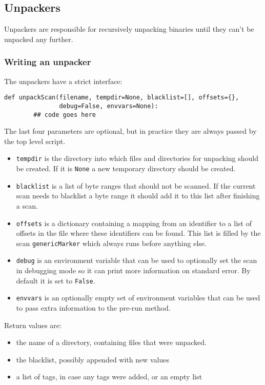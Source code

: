 \documentclass[10pt]{article}
\begin{document}
\subsection{Unpackers}

Unpackers are responsible for recursively unpacking binaries until they
can't be unpacked any further.

\subsubsection{Writing an unpacker}

The unpackers have a strict interface:

\begin{verbatim}
def unpackScan(filename, tempdir=None, blacklist=[], offsets={},
               debug=False, envvars=None):
        ## code goes here
\end{verbatim}

The last four parameters are optional, but in practice they are always passed
by the top level script.

\begin{itemize}
\item \texttt{tempdir} is the directory into which files and directories for
unpacking should be created. If it is \texttt{None} a new temporary directory
should be created.
\item \texttt{blacklist} is a list of byte ranges that should not be scanned.
If the current scan needs to blacklist a byte range it should add it to this
list after finishing a scan.
\item \texttt{offsets} is a dictionary containing a mapping from an identifier
to a list of offsets in the file where these identifiers can be found. This
list is filled by the scan \texttt{genericMarker} which always runs before
anything else.
\item \texttt{debug} is an environment variable that can be used to optionally
set the scan in debugging mode so it can print more information on standard
error. By default it is set to \texttt{False}.
\item \texttt{envvars} is an optionally empty set of environment variables that
can be used to pass extra information to the pre-run method.
\end{itemize}

Return values are:

\begin{itemize}
\item the name of a directory, containing files that were unpacked.
\item the blacklist, possibly appended with new values
\item a list of tags, in case any tags were added, or an empty list
\end{itemize}
\end{document}
